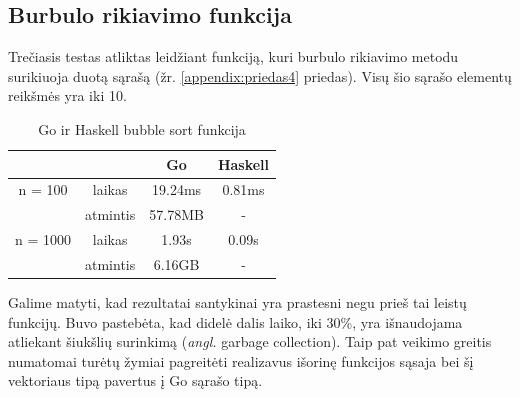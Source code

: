 \documentclass{VUMIFPSbakalaurinis}
\begin{document}
\subsection{Burbulo rikiavimo funkcija}
Trečiasis testas atliktas leidžiant funkciją, kuri burbulo rikiavimo metodu surikiuoja duotą sąrašą (žr. \ref{appendix:priedas4} priedas). Visų šio sąrašo elementų reikšmės yra iki 10.
			\begin{center}
				\centering
				\begin{table}[H]
					\caption{Go ir Haskell bubble sort funkcija}
					\centering
				\begin{tabular}{ cccc } 
				& & \textbf{Go} & \textbf{Haskell}  \\
				\midrule
				n = 100 & laikas & 19.24ms & 0.81ms    \\
				 & atmintis & 57.78MB & -  \\
				\midrule
				n = 1000 & laikas & 1.93s & 0.09s  \\
				 & atmintis & 6.16GB & - \\
				\midrule
				\end{tabular}
				\centering
			\end{table}
				\end{center}
Galime matyti, kad rezultatai santykinai yra prastesni negu prieš tai leistų funkcijų. Buvo pastebėta, kad didelė dalis laiko, iki 30\%, yra išnaudojama atliekant šiukšlių surinkimą (\textit{angl.} garbage collection). Taip pat veikimo greitis numatomai turėtų žymiai pagreitėti realizavus išorinę funkcijos sąsaja bei šį vektoriaus tipą pavertus į Go sąrašo tipą.
\end{document}
